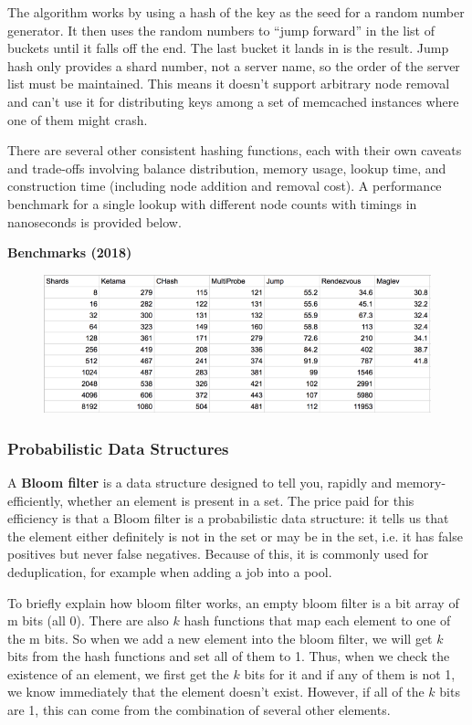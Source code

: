 \documentclass{article}
\begin{document}
    The algorithm works by using a hash of the key as the seed for a random number generator. It then uses the random numbers to ``jump forward” in the list of buckets until it falls off the end. The last bucket it lands in is the result. Jump hash only provides a shard number, not a server name, so the order of the server list must be maintained. This means it doesn't support arbitrary node removal and can’t use it for distributing keys among a set of memcached instances where one of them might crash.

    There are several other consistent hashing functions, each with their own caveats and trade-offs involving balance distribution, memory usage, lookup time, and construction time (including node addition and removal cost). A performance benchmark for a single lookup with different node counts with timings in nanoseconds is provided below.
    
    \textbf{Benchmarks (2018)}
    \begin{figure}[h]
        \centering
        \includegraphics[width=14cm]{consistent-hashing-benchmarks.png}
    \end{figure}
    
    \subsubsection{Probabilistic Data Structures}
    A \textbf{Bloom filter} is a data structure designed to tell you, rapidly and memory-efficiently, whether an element is present in a set. The price paid for this efficiency is that a Bloom filter is a probabilistic data structure: it tells us that the element either definitely is not in the set or may be in the set, i.e. it has false positives but never false negatives. Because of this, it is commonly used for deduplication, for example when adding a job into a pool.
    
    To briefly explain how bloom filter works, an empty bloom filter is a bit array of m bits (all 0). There are also $k$ hash functions that map each element to one of the m bits. So when we add a new element into the bloom filter, we will get $k$ bits from the hash functions and set all of them to 1. Thus, when we check the existence of an element, we first get the $k$ bits for it and if any of them is not 1, we know immediately that the element doesn't exist. However, if all of the $k$ bits are 1, this can come from the combination of several other elements.
    
\end{document}
